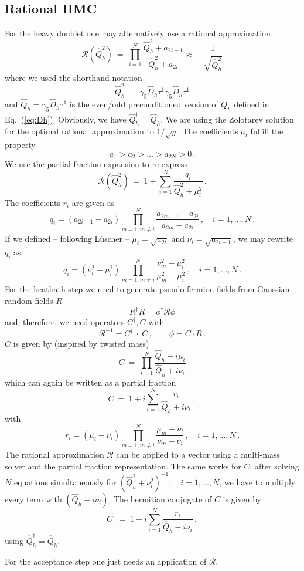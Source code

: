 \subsection{Rational HMC} \label{subsec:rationalhmc}

For the heavy doublet one may alternatively use a rational
approximation 
\[
\mathcal{R}(\hat Q_h^2)\ = \ \prod_{i = 1}^N \frac{\hat Q_h^2 +
  a_{2i-1}}{\hat Q_h^2 + a_{2i}}\approx\quad\frac{1}{\sqrt{\hat Q_h^2}}
\]
where we used the shorthand notation
\[
\hat Q_h^2\ =\ \gamma_5 \hat D_h \tau^1\gamma_5\hat D_h \tau^1 
\]
and $\hat Q_h=\gamma_5\hat D_h\tau^1$ is the even/odd preconditioned version
of $Q_h$ defined in Eq.~(\ref{eq:Dh}). Obviously, we have $\hat
Q_h^\dagger = \hat Q_h$. 
We are using the Zolotarev solution for the
optimal rational approximation to $1/\sqrt{y}$. The coefficients $a_i$
fulfill the property
\[
a_1 > a_2 > ... > a_{2N} > 0\, .
\]
We use the partial fraction expansion to re-express
\[
\mathcal{R}(\hat Q_h^2)\ = \ 1 + \sum_{i=1}^{N} \frac{q_i}{\hat Q_h^2 +
  \mu_i^2}\, .
\]
The coefficients $r_i$ are given as
\[
q_i = (a_{2i-1} - a_{2i}) \prod_{m=1, m\neq i}^N \frac{a_{2m-1}
  - a_{2i}}{a_{2m} - a_{2i}}\,,\quad i = 1,...,N\,.
\]
If we defined -- following L{\"u}scher -- $\mu_i = \sqrt{a_{2i}}$ and $\nu_i
= \sqrt{a_{2i-1}}$, we may rewrite $q_i$ as
\[
q_i = (\nu_i^2 - \mu_i^2)\prod_{m=1, m\neq i}^N \frac{\nu_m^2 -
  \mu_i^2}{\mu_m^2 - \mu_i^2}\,,\quad i = 1,...,N\, .
\]
For the heatbath step we need to generate pseudo-fermion fields from
Gaussian random fields $R$
\[
R^\dagger R = \phi^\dagger \mathcal{R} \phi
\]
and, therefore, we need operators $C^\dagger, C$ with
\[
\mathcal{R}^{-1} = C^\dagger\ \cdot\ C\,,\qquad \phi = C\cdot R\,.
\]
$C$ is given by (inspired by twisted mass)
\[
C\ =\ \prod_{i=1}^N \frac{\hat Q_h + i\mu_i}{\hat Q_h + i\nu_i}
\]
which can again be written as a partial fraction
\[
C\ =\ 1 + i\sum_{i=1}^N \frac{r_i}{\hat Q_h + i\nu_i}\,,
\]
with
\[
r_i = (\mu_i - \nu_i)\prod_{m=1, m\neq i}^N \frac{\mu_m -
  \nu_i}{\nu_m - \nu_i}\,,\quad i = 1,...,N\, .
\]
The rational approximation $\mathcal{R}$ can be applied to a vector
using a multi-mass solver and the partial fraction representation. The
same works for $C$: after solving $N$ equations simultaneously for
$(\hat Q_h^2 + \nu_i^2)^{-1},\quad i = 1,...,N$, we have to multiply
every term with $(\hat Q_h - i\nu_i)$. The hermitian conjugate of $C$
is given by
\[
C^\dagger\ =\ 1 - i\sum_{i=1}^N \frac{r_i}{\hat Q_h - i\nu_i}\,,
\]
using $\hat Q_h^\dagger = \hat Q_h$.

For the acceptance step one just needs an application of $\mathcal{R}$.

